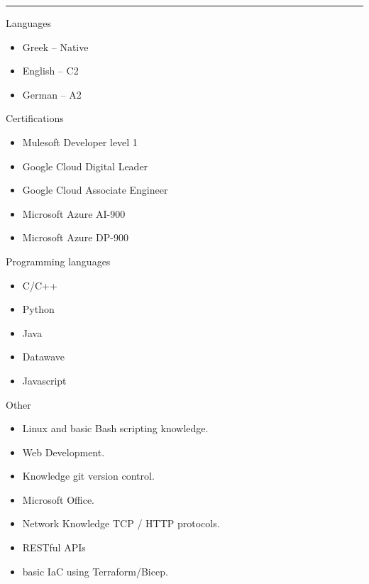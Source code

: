 \documentclass[a4paper,10pt]{article}
\newlength{\cvcolumngapwidth}
\newlength{\cvleftcolumnwidth}
\newlength{\cvrightcolumnwidth}
\newcommand{\cvsectionstyle}[1]{{\normalsize\cvsectionfont\textcolor{cvsectioncolor}{#1}}}
\newcommand{\cvheadingstyle}[1]{{\normalsize\cvheadingfont\textcolor{cvheadingcolor}{#1}}}
\newlength{\cvafteritemskipamount}
\newlength{\cvaftersectionskipamount}
\newlength{\cvbetweensectionandheadingextraskipamount}
\newlength{\cvparskip}
\newcommand{\cvsection}[1]{
    \begin{minipage}[t]{\cvleftcolumnwidth}
        \raggedleft\cvsectionstyle{#1}
    \end{minipage}%
    \hspace{\cvcolumngapwidth}%
    \begin{minipage}[t]{\cvrightcolumnwidth}
        \textcolor{cvrulecolor}{\rule{\cvrightcolumnwidth}{0.3mm}}
    \end{minipage}

    \vspace{\cvaftersectionskipamount}
}
\newcommand{\cvitem}[2]{
    \begin{minipage}[t]{\cvleftcolumnwidth}
        \raggedleft #1
    \end{minipage}%
    \hspace{\cvcolumngapwidth}%
    \begin{minipage}[t]{\cvrightcolumnwidth}
        \setlength{\parskip}{\cvparskip} #2
    \end{minipage}

    \vspace{\cvafteritemskipamount}
}
\begin{document}
\cvsection{QUALIFICATIONS}

\vspace{\cvbetweensectionandheadingextraskipamount}

\cvitem{
    \cvheadingstyle{Languages}
}{
   
   
    \begin{itemize}
        \item  Greek -- Native
        \item  English -- C2
        \item  German -- A2
    \end{itemize}

   
   
   
}
\cvitem{
    \cvheadingstyle{Certifications}
}{
    \begin{itemize}
        \item  Mulesoft Developer level 1
        \item  Google Cloud Digital Leader
        \item Google Cloud Associate Engineer
        \item Microsoft Azure AI-900 
        \item Microsoft Azure DP-900
    \end{itemize}
    
}
\cvitem{
    \cvheadingstyle{Programming languages}
}{
   
    \begin{itemize}
        \item C/C++
        \item Python
        \item Java
        \item Datawave
        \item Javascript
        
    \end{itemize}

}
\cvitem{
    \cvheadingstyle{Other }
}{
    \begin{itemize}
        \item Linux and basic Bash scripting knowledge.
        \item Web Development.
        \item Knowledge git version control.
        \item Microsoft Office.
        \item Network Knowledge TCP / HTTP protocols.
        \item RESTful APIs 
        \item basic IaC using Terraform/Bicep.
    \end{itemize}
}
\end{document}
